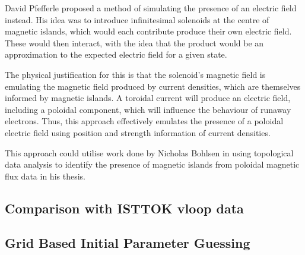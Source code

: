 David Pfefferle proposed a method of simulating the presence of 
an electric field instead. His idea was to introduce infinitesimal 
solenoids at the centre of magnetic islands, which would each contribute 
produce their own electric field. These would then interact, with the idea 
that the product would be an approximation to the expected 
electric field for a given state. 

The physical justification for this is that the solenoid's magnetic field is 
emulating the magnetic field produced by current densities, which 
are themselves informed by magnetic islands. A toroidal current 
will produce an electric field, including a poloidal component, which 
will influence the behaviour of runaway electrons. Thus, this approach 
effectively emulates the presence of a poloidal electric field using 
position and strength information of current densities.

This approach could utilise work done by Nicholas Bohlsen in using topological 
data analysis to identify the presence of magnetic islands from poloidal magnetic flux data in his thesis.

\subsection{Comparison with ISTTOK vloop data}

\subsection{Grid Based Initial Parameter Guessing}

